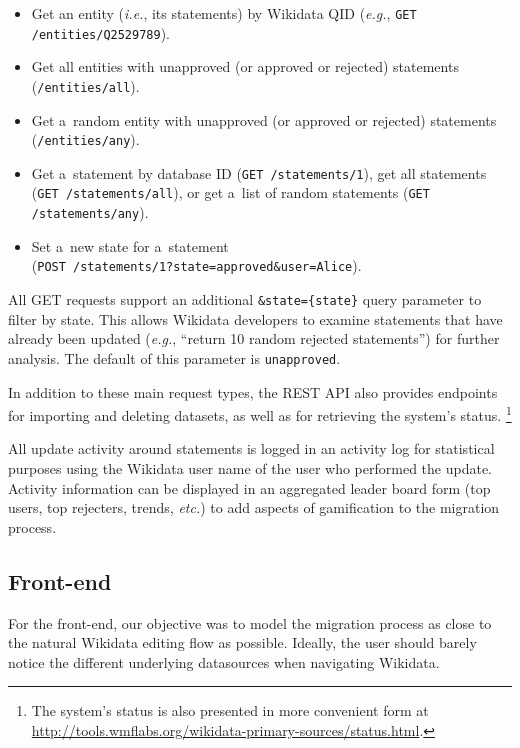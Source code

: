 \documentclass{sig-alternate-2013}
\begin{document}
\begin{itemize}
  \setlength\itemsep{0em}
  \item Get an entity (\emph{i.e.}, its statements) by Wikidata QID
  (\emph{e.g.}, \verb|GET /entities/Q2529789|).
  \item Get all entities with unapproved (or approved or rejected) statements
  (\verb|/entities/all|).
  \item Get a~random entity with unapproved (or approved or rejected) statements
  (\verb|/entities/any|).
  \item Get a~statement by database ID (\verb|GET /statements/1|), get all
    statements (\verb|GET /statements/all|), or get a~list of
  random statements (\verb|GET /statements/any|).
  \item Set a~new state for a~statement \\(\verb|POST /statements/1?state=approved&user=Alice|).
\end{itemize}

All GET requests support an additional \verb|&state={state}| query parameter to filter by state.
This allows Wikidata developers to examine statements
that have already been updated (\emph{e.g.}, ``return 10 random rejected statements'')
for further analysis.
The default of this parameter is \verb|unapproved|.

In addition to these main request types, the REST API also provides endpoints
for importing and deleting datasets, as well as for retrieving the system's status.%
\footnote{The system's status is also presented in more convenient form at
\url{http://tools.wmflabs.org/wikidata-primary-sources/status.html}.}

All update activity around statements is logged in an activity log
for statistical purposes using the Wikidata user name of the user who performed the update.
Activity information can be displayed in an aggregated leader board form
(top users, top rejecters, trends, \emph{etc.}) to add aspects of gamification to the migration process.

\subsection{Front-end}

For the front-end, our objective was to model the migration process
as close to the natural Wikidata editing flow as possible.
Ideally, the user should barely notice the different underlying datasources
when navigating Wikidata.
\end{document}
